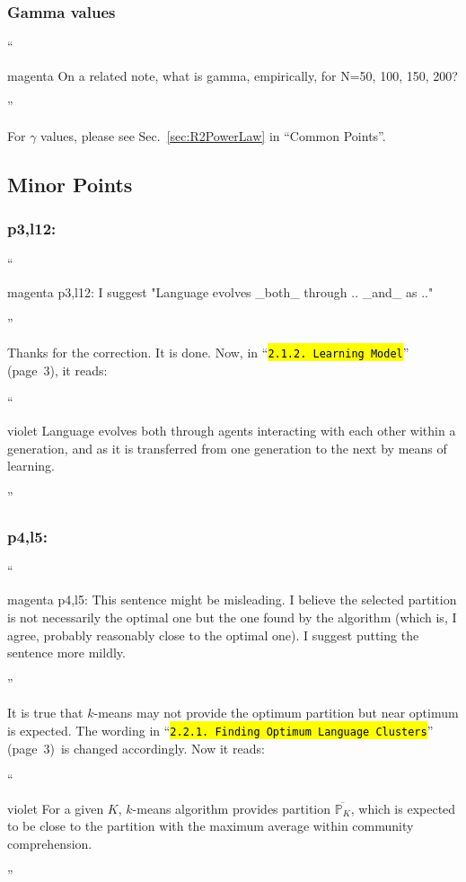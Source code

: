 \documentclass[10.5pt]{amsart}
\newcommand{\refsec}[1]{Sec.~\ref{#1}}
\newcommand{\hbRoRCommonPoints}{``Common Points''}
\newcommand{\hbColorReviewer}{magenta}
\newcommand{\hbColorManuscript}{violet}
\newenvironment{hbReviewer}
	{\list{}{\leftmargin=2cm\rightmargin=1cm}\item[]``\begin{footnotesize}
	\begin{color}{\hbColorReviewer}}	
	{\end{color}\end{footnotesize}''\endlist}
\newcommand{\hbMRefP}[2]{``\texttt{{\color{\hbColorManuscript}\hl{#1}}}''  (page~#2)}
\newenvironment{hbChanged}
	{\list{}{\leftmargin=1cm\rightmargin=1.5cm}\item[]``\begin{small}
	\begin{color}{\hbColorManuscript}}	
	{\end{color}\end{small}''\endlist}
\newcommand{\hbMLearningModel}{\hbMRefP{2.1.2. Learning Model}{3}}
\newcommand{\hbMOptimumLanguageClusters}{\hbMRefP{2.2.1. Finding Optimum Language Clusters}{3}}
\newcommand{\hbPartition}[1]{\mathbb{#1}} %
\newcommand{\hbPartitionBest}[1]{\overline{\hbPartition{P}_{#1}}} %
\begin{document}
\subsubsection{Gamma values}
	\label{sec:AGammaValues}
\begin{hbReviewer}
	On a related note, what is gamma, empirically, for N=50, 100, 150, 200?
\end{hbReviewer}

For $\gamma$ values, please see \refsec{sec:R2PowerLaw} in \hbRoRCommonPoints.





\subsection{Minor Points}





\subsubsection{p3,l12:}
\begin{hbReviewer}
	p3,l12:
	I suggest "Language evolves \_both\_ through .. \_and\_ as .."
\end{hbReviewer}

Thanks for the correction. It is done.
Now, in \hbMLearningModel, it reads:
\begin{hbChanged}
	Language evolves
	both through agents interacting with each other within a  generation, 
	and as it is transferred from one generation to the next by means of learning.
\end{hbChanged}




\subsubsection{p4,l5:}
\begin{hbReviewer}
	p4,l5:
	This sentence might be misleading. 
	I believe the selected partition is not necessarily the optimal one but 
	the one found by the algorithm 
	(which is, I agree, probably reasonably close to the optimal one). 
	I suggest putting the sentence more mildly.
\end{hbReviewer}

It is true that $k$-means may not provide the optimum partition but near optimum is expected. 
The wording in \hbMOptimumLanguageClusters\
is changed accordingly.
Now it reads:
\begin{hbChanged}
	For a given $K$,
	$k$-means algorithm provides partition
	$\hbPartitionBest{K}$,
	which is expected to be close to the partition with
	the maximum 
	average within community comprehension.
\end{hbChanged}
\end{document}
